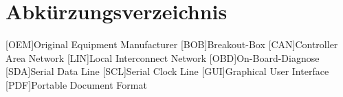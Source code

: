 \documentclass[a4paper,oneside,12pt]{report}
\renewcommand{\lstlistingname}{Programmcode}
\renewcommand{\lstlistlistingname}{\lstlistingname}
\begin{document}
	
	
	\clearpage
	\renewcommand{\lstlistingname}{Programmcodeverzeichnis}
	\lstlistoflistings
	\renewcommand{\lstlistlistingname}{\lstlistingname}
	
	
	
	\chapter*{Abkürzungsverzeichnis}
		\vspace{1.0cm}
		\begin{acronym}[SEPSEP]
			[OEM]{Original Equipment Manufacturer}
			[BOB]{Breakout-Box}
			[CAN]{Controller Area Network}
			[LIN]{Local Interconnect Network}
			[OBD]{On-Board-Diagnose}	
			[SDA]{Serial Data Line}
			[SCL]{Serial Clock Line}
			[GUI]{Graphical User Interface}
			[PDF]{Portable Document Format}
		\end{acronym}
	
	
	
\end{document}
